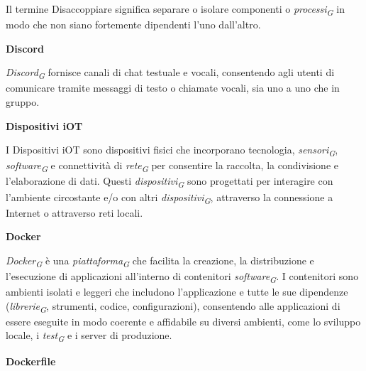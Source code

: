 \documentclass{article}
\begin{document}
Il termine Disaccoppiare significa separare o isolare componenti o \textit{processi}\textsubscript{\textit{G}} in modo che non siano fortemente dipendenti l'uno dall'altro.

\vspace{0.4cm}

\textbf{Discord}

\vspace{0.1cm}

\textit{Discord}\textsubscript{\textit{G}} fornisce canali di chat testuale e vocali, consentendo agli utenti di comunicare tramite messaggi di testo o chiamate vocali, sia uno a uno che in gruppo.

\vspace{0.4cm}

\textbf{Dispositivi iOT}

\vspace{0.1cm}

I Dispositivi iOT sono dispositivi fisici che incorporano tecnologia, \textit{sensori}\textsubscript{\textit{G}}, \textit{software}\textsubscript{\textit{G}} e connettività di \textit{rete}\textsubscript{\textit{G}} per consentire la raccolta, la condivisione e l'elaborazione di dati. Questi \textit{dispositivi}\textsubscript{\textit{G}} sono progettati per interagire con l'ambiente circostante e/o con altri \textit{dispositivi}\textsubscript{\textit{G}}, attraverso la connessione a Internet o attraverso reti locali.

\vspace{0.4cm}

\textbf{Docker}

\vspace{0.1cm}

\textit{Docker}\textsubscript{\textit{G}} è una \textit{piattaforma}\textsubscript{\textit{G}} che facilita la creazione, la distribuzione e l'esecuzione di applicazioni all'interno di contenitori \textit{software}\textsubscript{\textit{G}}. I contenitori sono ambienti isolati e leggeri che includono l'applicazione e tutte le sue dipendenze (\textit{librerie}\textsubscript{\textit{G}}, strumenti, codice, configurazioni), consentendo alle applicazioni di essere eseguite in modo coerente e affidabile su diversi ambienti, come lo sviluppo locale, i \textit{test}\textsubscript{\textit{G}} e i server di produzione.

\vspace{0.4cm}

\textbf{Dockerfile}

\vspace{0.1cm}
\end{document}
